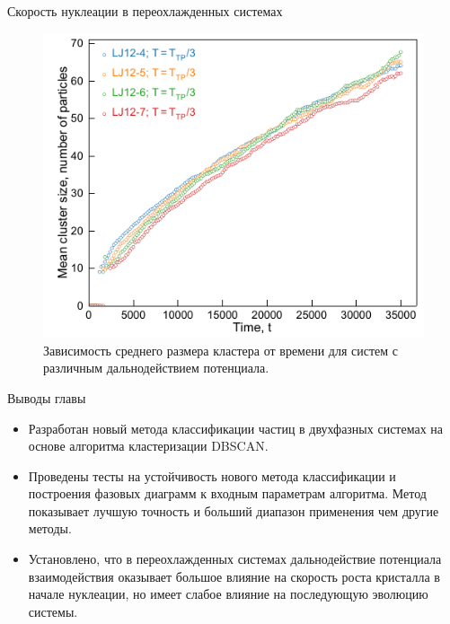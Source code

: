 \documentclass{beamer}
\begin{document}
\begin{frame}{Скорость нуклеации в переохлажденных системах}
\footnotesize{
\begin{figure}[!t]
    \centering
    \includegraphics[width=0.7\linewidth]{meanParticles.pdf}
    \caption{Зависимость среднего размера кластера от времени для систем с различным дальнодействием потенциала.}
    \label{meanParticles}
\end{figure}
}

\end{frame}









\begin{frame}{Выводы главы}
\footnotesize{
\begin{itemize}

    \item Разработан новый метода классификации частиц в двухфазных системах на основе алгоритма кластеризации DBSCAN.

    \item Проведены тесты на устойчивость нового метода классификации и построения фазовых диаграмм к входным параметрам алгоритма. Метод показывает лучшую точность и больший диапазон применения чем другие методы.

    \item Установлено, что в переохлажденных системах дальнодействие потенциала взаимодействия оказывает большое влияние на скорость роста кристалла в начале нуклеации, но имеет слабое влияние на последующую эволюцию системы.

\end{itemize}


}
\end{frame}
\end{document}
